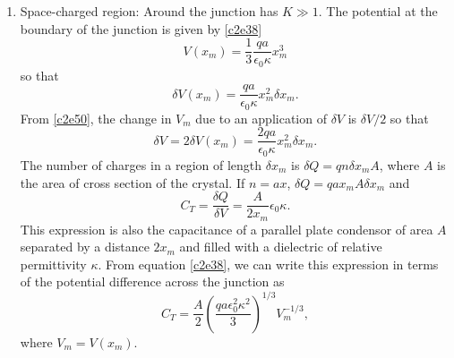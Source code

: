 \begin{enumerate}
\item Space-charged region:
Around the junction has $K \gg 1$. The potential at the boundary of the junction
is given by \eqref{c2e38}
\[
V(x_m) = \frac{1}{3}\frac{qa}{\epsilon_0\kappa}x_m^3
\]
so that
\[
\delta V(x_m) = \frac{qa}{\epsilon_0\kappa}x_m^2\delta x_m.
\]
From \eqref{c2e50}, the change in $V_m$ due to an application of $\delta V$
is $\delta V/2$ so that
\[
\delta V = 2\delta V(x_m) = \frac{2qa}{\epsilon_0\kappa}x_m^2\delta x_m.
\]
The number of charges in a region of length $\delta x_m$ is $\delta Q = 
qn\delta x_mA$, where $A$ is the area of cross section of the crystal. If $n = 
ax$, $\delta Q = qax_mA\delta x_m$ and
\begin{equation}\label{c2e63}
C_T = \frac{\delta Q}{\delta V} =  \frac{A}{2x_m}\epsilon_0\kappa.
\end{equation}
This expression is also the capacitance of a parallel plate condensor of area
$A$ separated by a distance $2x_m$ and filled with a dielectric of relative
permittivity $\kappa$. From equation \eqref{c2e38}, we can write this expression
in terms of the potential difference across the junction as
\begin{equation}\label{c2e64}
C_T = \frac{A}{2}\left(\frac{qa\epsilon_0^2\kappa^2}{3}\right)^{1/3}
V_m^{-1/3},
\end{equation}
where $V_m = V(x_m)$.
\end{enumerate}

